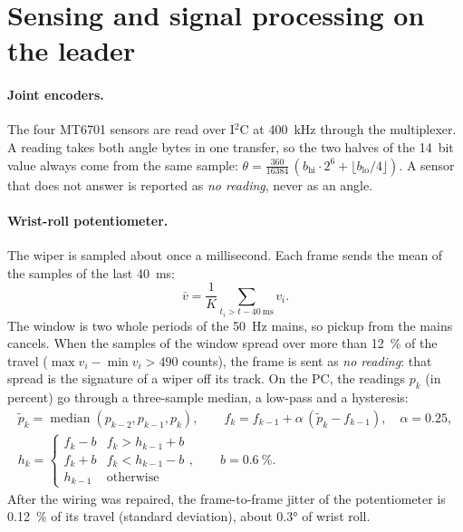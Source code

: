 \documentclass[11pt,a4paper]{article}
\begin{document}
\section{Sensing and signal processing on the leader}

\paragraph{Joint encoders.} The four MT6701 sensors are read over I$^2$C at \SI{400}{\kilo\hertz} through the
multiplexer. A reading takes both angle bytes in one transfer, so the two halves of the \SI{14}{bit} value
always come from the same sample: $\theta=\frac{360}{16384}\,(b_{\mathrm{hi}}\cdot 2^6+\lfloor b_{\mathrm{lo}}/4\rfloor)$.
A sensor that does not answer is reported as \emph{no reading}, never as an angle.

\paragraph{Wrist-roll potentiometer.} The wiper is sampled about once a millisecond. Each frame sends the mean of
the samples of the last \SI{40}{\milli\second}:
\begin{equation}
  \bar v=\frac1K\sum_{t_i>t-\SI{40}{\milli\second}} v_i .
\end{equation}
The window is two whole periods of the \SI{50}{\hertz} mains, so pickup from the mains cancels. When the samples
of the window spread over more than \SI{12}{\percent} of the travel ($\max v_i-\min v_i>490$ counts), the frame
is sent as \emph{no reading}: that spread is the signature of a wiper off its track. On the PC, the readings
$p_k$ (in percent) go through a three-sample median, a low-pass and a hysteresis:
\begin{gather}
  \tilde p_k=\operatorname{median}(p_{k-2},p_{k-1},p_k),\qquad
  f_k=f_{k-1}+\alpha\,(\tilde p_k-f_{k-1}),\quad \alpha=0.25,\\
  h_k=\begin{cases}f_k-b & f_k>h_{k-1}+b\\ f_k+b & f_k<h_{k-1}-b\\ h_{k-1}&\text{otherwise}\end{cases},
  \qquad b=\SI{0.6}{\percent}.
\end{gather}
After the wiring was repaired, the frame-to-frame jitter of the potentiometer is \SI{0.12}{\percent} of its
travel (standard deviation), about \ang{0.3} of wrist roll.
\end{document}
